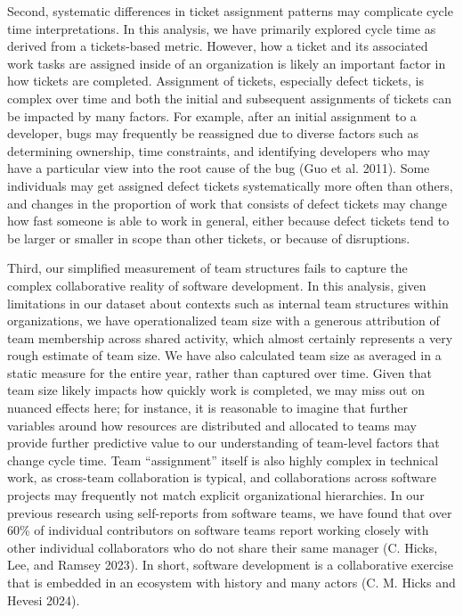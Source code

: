 \documentclass[
]{article}
\begin{document}
Second, systematic differences in ticket assignment patterns may
complicate cycle time interpretations. In this analysis, we have
primarily explored cycle time as derived from a tickets-based metric.
However, how a ticket and its associated work tasks are assigned inside
of an organization is likely an important factor in how tickets are
completed. Assignment of tickets, especially defect tickets, is complex
over time and both the initial and subsequent assignments of tickets can
be impacted by many factors. For example, after an initial assignment to
a developer, bugs may frequently be reassigned due to diverse factors
such as determining ownership, time constraints, and identifying
developers who may have a particular view into the root cause of the bug
(Guo et al. 2011). Some individuals may get assigned defect tickets
systematically more often than others, and changes in the proportion of
work that consists of defect tickets may change how fast someone is able
to work in general, either because defect tickets tend to be larger or
smaller in scope than other tickets, or because of disruptions.

Third, our simplified measurement of team structures fails to capture
the complex collaborative reality of software development. In this
analysis, given limitations in our dataset about contexts such as
internal team structures within organizations, we have operationalized
team size with a generous attribution of team membership across shared
activity, which almost certainly represents a very rough estimate of
team size. We have also calculated team size as averaged in a static
measure for the entire year, rather than captured over time. Given that
team size likely impacts how quickly work is completed, we may miss out
on nuanced effects here; for instance, it is reasonable to imagine that
further variables around how resources are distributed and allocated to
teams may provide further predictive value to our understanding of
team-level factors that change cycle time. Team ``assignment'' itself is
also highly complex in technical work, as cross-team collaboration is
typical, and collaborations across software projects may frequently not
match explicit organizational hierarchies. In our previous research
using self-reports from software teams, we have found that over 60\% of
individual contributors on software teams report working closely with
other individual collaborators who do not share their same manager (C.
Hicks, Lee, and Ramsey 2023). In short, software development is a
collaborative exercise that is embedded in an ecosystem with history and
many actors (C. M. Hicks and Hevesi 2024).
\end{document}
